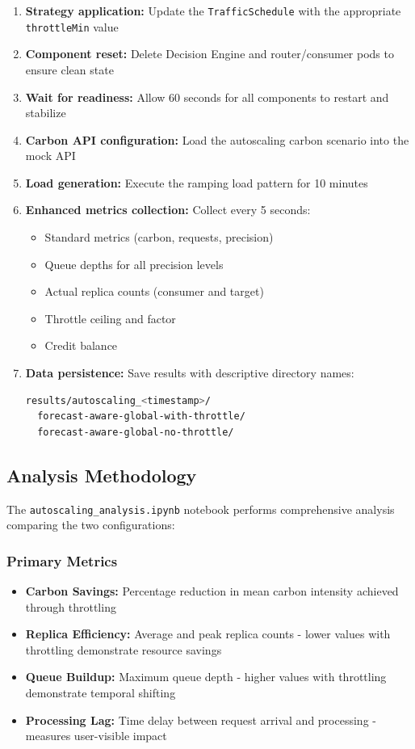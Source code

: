 \begin{enumerate}
    \item \textbf{Strategy application:} Update the \texttt{TrafficSchedule} with the appropriate \texttt{throttleMin} value
    \item \textbf{Component reset:} Delete Decision Engine and router/consumer pods to ensure clean state
    \item \textbf{Wait for readiness:} Allow 60 seconds for all components to restart and stabilize
    \item \textbf{Carbon API configuration:} Load the autoscaling carbon scenario into the mock API
    \item \textbf{Load generation:} Execute the ramping load pattern for 10 minutes
    \item \textbf{Enhanced metrics collection:} Collect every 5 seconds:
    \begin{itemize}
        \item Standard metrics (carbon, requests, precision)
        \item Queue depths for all precision levels
        \item Actual replica counts (consumer and target)
        \item Throttle ceiling and factor
        \item Credit balance
    \end{itemize}
    \item \textbf{Data persistence:} Save results with descriptive directory names:
    \begin{lstlisting}[language=bash]
results/autoscaling_<timestamp>/
  forecast-aware-global-with-throttle/
  forecast-aware-global-no-throttle/\end{lstlisting}
\end{enumerate}

\subsection{Analysis Methodology}

The \texttt{autoscaling\_analysis.ipynb} notebook performs comprehensive analysis comparing the two configurations:

\subsubsection{Primary Metrics}

\begin{itemize}
    \item \textbf{Carbon Savings:} Percentage reduction in mean carbon intensity achieved through throttling
    \item \textbf{Replica Efficiency:} Average and peak replica counts - lower values with throttling demonstrate resource savings
    \item \textbf{Queue Buildup:} Maximum queue depth - higher values with throttling demonstrate temporal shifting
    \item \textbf{Processing Lag:} Time delay between request arrival and processing - measures user-visible impact
\end{itemize}

